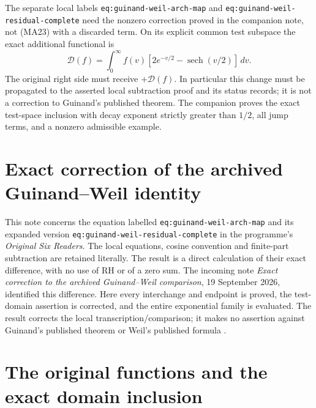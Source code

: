 \documentclass[11pt,a4paper]{article}
\providecommand{\dd}{\,d}
\begin{document}
The separate local labels \texttt{eq:guinand-weil-arch-map} and
\nolinkurl{eq:guinand-weil-residual-complete} need the nonzero correction proved
in the companion note, not (MA23) with a discarded term. On its explicit
common test subspace the exact additional functional is
\[
 \mathcal D(f)=\int_0^\infty f(v)
       [2e^{-v/2}-\operatorname{sech}(v/2)]\dd v.
\]
The original right side must receive $+\mathcal D(f)$. In particular this
change must be propagated to the asserted local subtraction proof and its
status records; it is not a correction to Guinand's published theorem.
The companion proves the exact test-space inclusion with decay exponent
strictly greater than $1/2$, all jump terms, and a nonzero admissible example.



\endgroup

\clearpage
\begingroup
\def\R{\mathbb R}
\def\C{\mathbb C}
\def\PF{\operatorname{PF}}
\def\sech{\operatorname{sech}}

\setcounter{equation}{0}
\renewcommand{\theequation}{A03GC.\arabic{equation}}
\section*{Exact correction of the archived Guinand--Weil identity}



This note concerns the equation labelled
\texttt{eq:guinand-weil-arch-map} and its expanded version
\texttt{eq:guinand-weil-residual-complete} in the programme's
\emph{Original Six Readers}.  The local equations, cosine convention and
finite-part subtraction are retained literally.  The result is a direct
calculation of their exact difference, with no use of RH or of a zero sum.
The incoming note \emph{Exact correction to the archived Guinand--Weil
comparison}, 19 September 2026, identified this difference.  Here every
interchange and endpoint is proved, the test-domain assertion is corrected,
and the entire exponential family is evaluated.  The result corrects the
local transcription/comparison; it makes no assertion against Guinand's
published theorem \cite{a03gc:guinand1948} or Weil's published formula
\cite{a03gc:weil1952}.

\section{The original functions and the exact domain inclusion}
\end{document}

